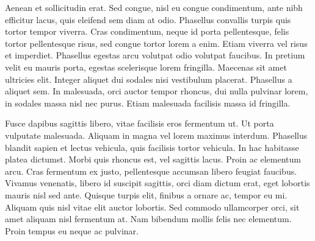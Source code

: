 Aenean et sollicitudin erat. Sed congue, nisl eu congue condimentum, ante nibh efficitur lacus, quis eleifend sem diam at odio. Phasellus convallis turpis quis tortor tempor viverra. Cras condimentum, neque id porta pellentesque, felis tortor pellentesque risus, sed congue tortor lorem a enim. Etiam viverra vel risus et imperdiet. Phasellus egestas arcu volutpat odio volutpat faucibus. In pretium velit eu mauris porta, egestas scelerisque lorem fringilla. Maecenas sit amet ultricies elit. Integer aliquet dui sodales nisi vestibulum placerat. Phasellus a aliquet sem. In malesuada, orci auctor tempor rhoncus, dui nulla pulvinar lorem, in sodales massa nisl nec purus. Etiam malesuada facilisis massa id fringilla.

Fusce dapibus sagittis libero, vitae facilisis eros fermentum ut. Ut porta vulputate malesuada. Aliquam in magna vel lorem maximus interdum. Phasellus blandit sapien et lectus vehicula, quis facilisis tortor vehicula. In hac habitasse platea dictumst. Morbi quis rhoncus est, vel sagittis lacus. Proin ac elementum arcu. Cras fermentum ex justo, pellentesque accumsan libero feugiat faucibus. Vivamus venenatis, libero id suscipit sagittis, orci diam dictum erat, eget lobortis mauris nisl sed ante. Quisque turpis elit, finibus a ornare ac, tempor eu mi. Aliquam quis nisl vitae elit auctor lobortis. Sed commodo ullamcorper orci, sit amet aliquam nisl fermentum at. Nam bibendum mollis felis nec elementum. Proin tempus eu neque ac pulvinar.
